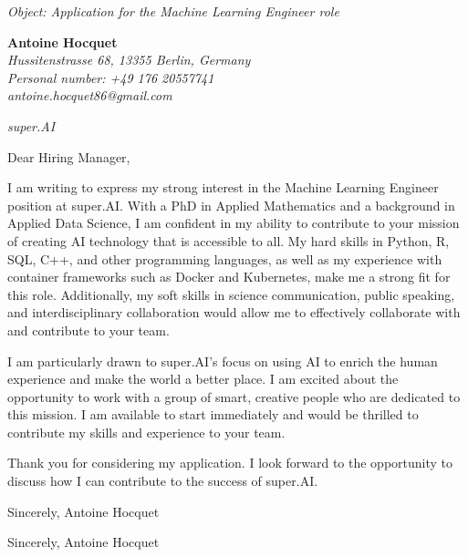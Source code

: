 \documentclass[12pt]{letter}
\begin{document}
\begin{letter}{ \itshape Object: Application for the Machine Learning Engineer role }
\hfill
\begin{flushleft}
    {\bfseries Antoine Hocquet }\\[.35ex]
    \small\itshape
    Hussitenstrasse 68, 13355 Berlin, Germany\\
    Personal number: +49 176 20557741\\
    antoine.hocquet86@gmail.com
\end{flushleft}

\hfill
\begin{flushright}
    \itshape super.AI \\
\end{flushright}

\opening{ Dear Hiring Manager, }

I am writing to express my strong interest in the Machine Learning Engineer position at super.AI. With a PhD in Applied Mathematics and a background in Applied Data Science, I am confident in my ability to contribute to your mission of creating AI technology that is accessible to all. My hard skills in Python, R, SQL, C++, and other programming languages, as well as my experience with container frameworks such as Docker and Kubernetes, make me a strong fit for this role. Additionally, my soft skills in science communication, public speaking, and interdisciplinary collaboration would allow me to effectively collaborate with and contribute to your team.

I am particularly drawn to super.AI's focus on using AI to enrich the human experience and make the world a better place. I am excited about the opportunity to work with a group of smart, creative people who are dedicated to this mission. I am available to start immediately and would be thrilled to contribute my skills and experience to your team.

Thank you for considering my application. I look forward to the opportunity to discuss how I can contribute to the success of super.AI.

Sincerely, Antoine Hocquet

\closing{ Sincerely, Antoine Hocquet }

\end{letter}
\end{document}
